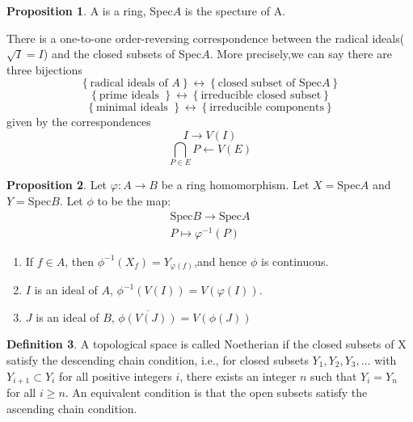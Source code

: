 \documentclass[a4paper,12pt]{article}
\newcommand{\bbrace}[1]{\left\{ #1 \right\} }
\theoremstyle{definition}
\newtheorem{defn}{Definition}[subsection]
\newtheorem{prop}[defn]{Proposition}
\begin{document}
\begin{prop}
    A is a ring, Spec$A$ is the specture of A.

    There is a one-to-one order-reversing correspondence
    between the radical ideals($\sqrt{I}=I$) and the closed subsets of Spec$A$. More precisely,we can say there are three bijections
    \begin{equation*}
        \bbrace{\text{radical ideals of } A}\longleftrightarrow \bbrace{\text{closed subset of } \text{Spec}A}
    \end{equation*}
    \begin{equation*}
        \bbrace{\text{prime ideals }}\longleftrightarrow \bbrace{\text{irreducible closed subset}}
    \end{equation*}
    \begin{equation*}
        \bbrace{\text{minimal ideals }}\longleftrightarrow \bbrace{\text{irreducible components}}
    \end{equation*}
    given by the correspondences
    \begin{equation*}
        I \longrightarrow  V(I)
    \end{equation*}
    \begin{equation*}
        \bigcap_{P\in E}P   \longleftarrow V(E)
    \end{equation*}
    \label{theorem:radical ideal and closed subset}
\end{prop}
\begin{prop}
    Let $\varphi: A\rightarrow B$ be a ring homomorphism. Let $X=$Spec$A$ and $Y=$Spec$B$.
    Let $\phi$ to be the map:
    \begin{align*}
        \text{Spec}B\rightarrow \text{Spec}A \\
        P \mapsto \varphi^{-1}(P)
    \end{align*}
    \begin{enumerate}[(1)]
        \item If $f\in A$, then $\phi^{-1}(X_f)=Y_{\varphi(f)}$,and hence $\phi$ is continuous.
        \item $I$ is an ideal of $A$, $\phi^{-1}(V(I))=V(\varphi(I))$.
        \item $J$ is an ideal of $B$, $\overline{\phi(V(J))}=V(\phi(J))$
    \end{enumerate}
\end{prop}
\begin{defn}
    A topological space is called Noetherian if the closed subsets of X satisfy the descending
    chain condition, i.e., for closed subsets $Y_1,Y_2,Y_3,\dots$ with $Y_{i+1}\subset Y_i$
    for all positive integers $i$, there exists an integer $n$ such that $Y_i = Y_n$
    for all $i\ge n$. An equivalent condition is that the open subsets satisfy the
    ascending chain condition.
\end{defn}
\end{document}
